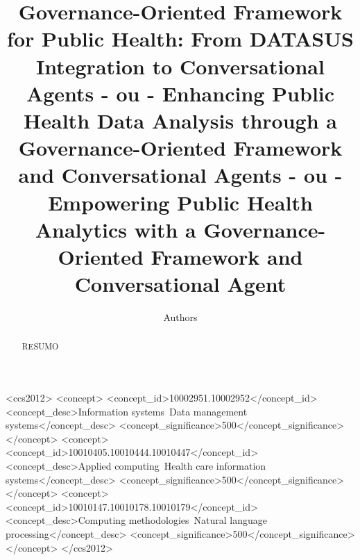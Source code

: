 \documentclass[sigconf,natbib=false]{acmart}
\begin{document}
\title{Governance-Oriented Framework for Public Health: From DATASUS Integration to Conversational Agents - ou - Enhancing Public Health Data Analysis through a Governance-Oriented Framework and Conversational Agents - ou - Empowering Public Health Analytics with a Governance-Oriented Framework and Conversational Agent}
\renewcommand{\shorttitle}{Hope it is}

\author{Authors}




\renewcommand{\shortauthors}{Author et al.}

\begin{abstract}
  RESUMO
\end{abstract}

\begin{CCSXML}
<ccs2012>
   <concept>
       <concept_id>10002951.10002952</concept_id>
       <concept_desc>Information systems~Data management systems</concept_desc>
       <concept_significance>500</concept_significance>
       </concept>
   <concept>
       <concept_id>10010405.10010444.10010447</concept_id>
       <concept_desc>Applied computing~Health care information systems</concept_desc>
       <concept_significance>500</concept_significance>
       </concept>
   <concept>
       <concept_id>10010147.10010178.10010179</concept_id>
       <concept_desc>Computing methodologies~Natural language processing</concept_desc>
       <concept_significance>500</concept_significance>
       </concept>
 </ccs2012>
\end{CCSXML}
\end{document}
